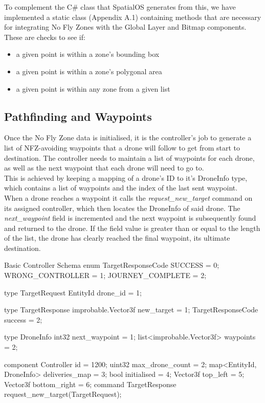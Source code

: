 \documentclass[a4paper,11pt,titlepage]{report}
\begin{document}
To complement the C\# class that SpatialOS generates from this, we have implemented a static class (Appendix A.1) containing methods that are necessary for integrating No Fly Zones with the Global Layer and Bitmap components. These are checks to see if:
\begin{itemize}
  \item a given point is within a zone's bounding box
  \item a given point is within a zone's polygonal area
  \item a given point is within any zone from a given list
\end{itemize}

\clearpage
\subsection{Pathfinding and Waypoints}
Once the No Fly Zone data is initialised, it is the controller's job to generate a list of NFZ-avoiding waypoints that a drone will follow to get from start to destination. The controller needs to maintain a list of waypoints for each drone, as well as the next waypoint that each drone will need to go to.\\

This is achieved by keeping a mapping of a drone's ID to it's DroneInfo type, which contains a list of waypoints and the index of the last sent waypoint.\\

When a drone reaches a waypoint it calls the \textit{request\_new\_target} command on its assigned controller, which then locates the DroneInfo of said drone. The \textit{next\_waypoint} field is incremented and the next waypoint is subsequently found and returned to the drone. If the field value is greater than or equal to the length of the list, the drone has clearly reached the final waypoint, its ultimate destination.

\begin{sexylisting}[colback=white]{Basic Controller Schema}
enum TargetResponseCode {
  SUCCESS = 0;
  WRONG_CONTROLLER = 1;
  JOURNEY_COMPLETE = 2;
}

type TargetRequest {
  EntityId drone_id = 1;
}

type TargetResponse {
  improbable.Vector3f new_target = 1;
  TargetResponseCode success = 2;
}

type DroneInfo {
  int32 next_waypoint = 1;
  list<improbable.Vector3f> waypoints = 2;
}

component Controller {
  id = 1200;
  uint32 max_drone_count = 2;
  map<EntityId, DroneInfo> deliveries_map = 3;
  bool initialised = 4;
  Vector3f top_left = 5;
  Vector3f bottom_right = 6;
  command TargetResponse request_new_target(TargetRequest);
}
\end{sexylisting}
\end{document}
